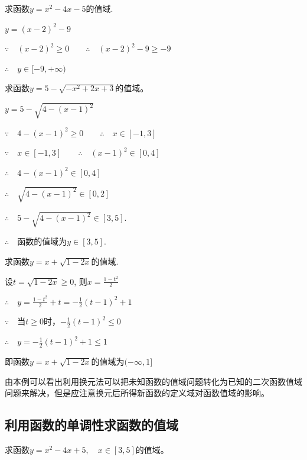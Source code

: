 \begin{example}
求函数$y=x^{2}-4x-5$的值域.    
\end{example}

\begin{solution}
    $y=(x-2)^{2}-9$

$\because\quad (x-2)^{2}\ge 0\qquad \therefore\quad (x-2)^{2}-9\ge -9$

$\therefore\quad y\in[-9,+\infty)$
\end{solution}

\begin{example}
   求函数$y=5-\sqrt{-x^{2}+2x+3}$的值域。 
\end{example}

\begin{solution}
    $y=5-\sqrt{4-(x-1)^{2}}$

    $\because\quad 4-(x-1)^{2}\ge 0\qquad \therefore\quad x\in[-1,3]$

    $\because\quad  x\in[-1,3]\qquad \therefore\quad (x-1)^{2}\in [0,4]$

$\therefore\quad 4-(x-1)^{2}\in[0,4]$

$\therefore\quad\sqrt{4-(x-1)^{2}}\in[0,2]$

$\therefore\quad 5-\sqrt{4-(x-1)^{2}}\in[3,5]$.

$\therefore\quad $函数的值域为$y\in[3,5]$.
\end{solution}

\begin{example}
    求函数$y=x+\sqrt{1-2x}$的值域.
\end{example}

\begin{solution}
设$t=\sqrt{1-2x}\ge 0$, 则$x=\frac{1-t^2}{2}$

$\therefore\quad y=\frac{1-t^2}{2}+t=-\frac{1}{2}(t-1)^2+1$

$\because\quad $当$t\ge 0$时，$-\frac{1}{2}(t-1)^2\le 0$

$\therefore\quad y=-\frac{1}{2}(t-1)^2+1\le 1$

即函数$y=x+\sqrt{1-2x}$的值域为$(-\infty,1]$
\end{solution}

由本例可以看出利用换元法可以把未知函数的值域问题转化为已知的二次函数值域问题来解决，但是应注意换元后所得新函数的定义域对函数值域的影响。

\subsection{利用函数的单调性求函数的值域}
\begin{example}
    求函数$y=x^2-4x+5,\quad x\in [3,5]$的值域。
\end{example}

